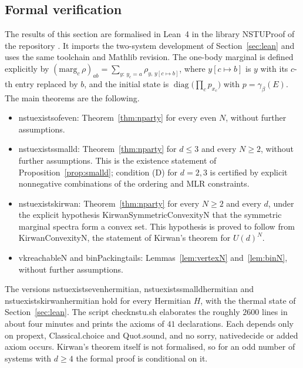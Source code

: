 \documentclass[11pt]{amsart}
\theoremstyle{definition}
\theoremstyle{remark}
\numberwithin{equation}{section}
\newcommand{\diag}{\operatorname{diag}}
\newcommand{\leanus}{\textunderscore\allowbreak}
\newcommand{\lean}[1]{{\ttfamily\let\_\leanus #1}}
\begin{document}
\subsection{Formal verification}\label{sec:nparty-lean}
The results of this section are formalised in Lean~4 in the library \lean{NSTUProof} of the repository
\cite{STUrepo}. It imports the two-system development of Section~\ref{sec:lean} and uses the same toolchain and
Mathlib revision. The one-body marginal is defined explicitly by
$(\mathrm{marg}_c\,\rho)_{ab}=\sum_{y:\,y_c=a}\rho_{y,\,y[c\mapsto b]}$, where $y[c\mapsto b]$ is $y$ with its $c$-th
entry replaced by $b$, and the initial state is $\diag\big(\prod_c p_{x_c}\big)$ with $p=\gamma_\beta(E)$. The main
theorems are the following.
\begin{itemize}
\item \lean{nstu\_exists\_of\_even}: Theorem~\ref{thm:nparty} for every even $N$, without further assumptions.
\item \lean{nstu\_exists\_small\_d}: Theorem~\ref{thm:nparty} for $d\le3$ and every $N\ge2$, without further
assumptions. This is the existence statement of Proposition~\ref{prop:smalld}; condition (D) for $d=2,3$ is
certified by explicit nonnegative combinations of the ordering and MLR constraints.
\item \lean{nstu\_exists\_kirwan}: Theorem~\ref{thm:nparty} for every $N\ge2$ and every $d$, under the explicit
hypothesis \lean{KirwanSymmetricConvexityN} that the symmetric marginal spectra form a convex set. This hypothesis is
proved to follow from \lean{KirwanConvexityN}, the statement of Kirwan's theorem for $U(d)^N$.
\item \lean{vk\_reachableN} and \lean{binPacking\_tails}: Lemmas~\ref{lem:vertexN} and~\ref{lem:binN}, without
further assumptions.
\end{itemize}
The versions \lean{nstu\_exists\_even\_hermitian}, \lean{nstu\_exists\_small\_d\_hermitian} and
\lean{nstu\_exists\_kirwan\_hermitian} hold for every Hermitian $H$, with the thermal state of Section~\ref{sec:lean}.
The script \lean{check\_nstu.sh} elaborates the roughly $2600$ lines in about four minutes and prints the axioms of
$41$ declarations. Each depends only on \lean{propext}, \lean{Classical.choice} and \lean{Quot.sound}, and no
\lean{sorry}, \lean{native\_decide} or added axiom occurs. Kirwan's theorem itself is not formalised, so for an odd
number of systems with $d\ge4$ the formal proof is conditional on it.
\end{document}

